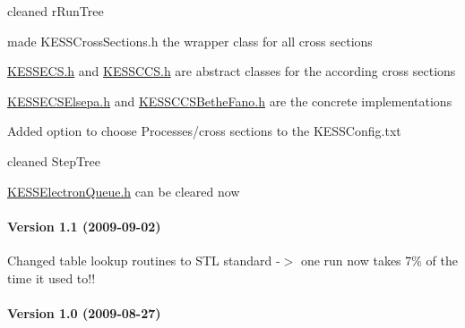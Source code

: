 \begin{DoxyItemize}
\item cleaned rRunTree
\item made KESSCrossSections.h the wrapper class for all cross sections
\item \hyperlink{_k_e_s_s_e_c_s_8h}{KESSECS.h} and \hyperlink{_k_e_s_s_c_c_s_8h}{KESSCCS.h} are abstract classes for the according cross sections
\item \hyperlink{_k_e_s_s_e_c_s_elsepa_8h}{KESSECSElsepa.h} and \hyperlink{_k_e_s_s_c_c_s_bethe_fano_8h}{KESSCCSBetheFano.h} are the concrete implementations
\item Added option to choose Processes/cross sections to the KESSConfig.txt
\item cleaned StepTree
\item \hyperlink{_k_e_s_s_electron_queue_8h}{KESSElectronQueue.h} can be cleared now
\end{DoxyItemize}\hypertarget{_k_e_s_s_changelog_v11}{}\paragraph{Version 1.1 (2009-\/09-\/02)}\label{_k_e_s_s_changelog_v11}

\begin{DoxyItemize}
\item Changed table lookup routines to STL standard -\/$>$ one run now takes 7\% of the time it used to!!
\end{DoxyItemize}\hypertarget{_k_e_s_s_changelog_v10}{}\paragraph{Version 1.0 (2009-\/08-\/27)}\label{_k_e_s_s_changelog_v10}

